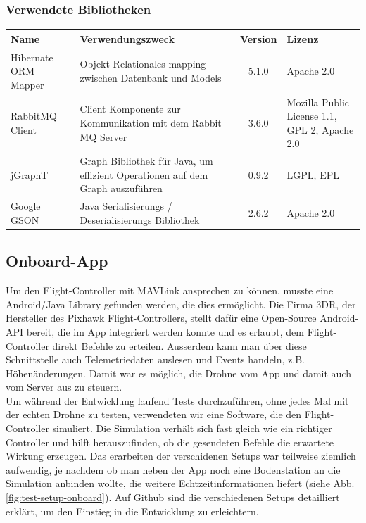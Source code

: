 \subsubsection{Verwendete Bibliotheken}
\begin{tabularx}{\textwidth}{|X|X|c|X|}
	\hline
	\textbf{Name} & \textbf{Verwendungszweck} & \textbf{Version} & \textbf{Lizenz} \\
	\hline \hline
	Hibernate ORM Mapper & Objekt-Relationales mapping zwischen Datenbank und Models  & 5.1.0 & Apache 2.0\\
	\hline 
	RabbitMQ Client & Client Komponente zur Kommunikation mit dem Rabbit MQ Server & 3.6.0 &  Mozilla Public License 1.1, GPL 2, Apache 2.0 \\
	\hline 
	jGraphT & Graph Bibliothek für Java, um effizient Operationen auf dem Graph auszuführen & 0.9.2 &  LGPL, EPL \\
	\hline 
	Google GSON & Java Serialisierungs / Deserialisierungs Bibliothek & 2.6.2 & Apache 2.0\\
	\hline 
\end{tabularx}

\subsection{Onboard-App}

Um den \Gls{Flight-Controller} mit \Gls{MAVLink} ansprechen zu können, musste eine Android/Java Library gefunden werden, die dies ermöglicht. Die Firma 3DR, der Hersteller des Pixhawk Flight-Controllers, stellt dafür eine Open-Source Android-API bereit, die im App integriert werden konnte und es erlaubt, dem Flight-Controller direkt Befehle zu erteilen. Ausserdem kann man über diese Schnittstelle auch Telemetriedaten auslesen und Events handeln, z.B. Höhenänderungen. Damit war es möglich, die Drohne vom App und damit auch vom Server aus zu steuern.\\

Um während der Entwicklung laufend Tests durchzuführen, ohne jedes Mal mit der echten Drohne zu testen, verwendeten wir eine Software, die den Flight-Controller simuliert. Die Simulation verhält sich fast gleich wie ein richtiger Controller und hilft herauszufinden, ob die gesendeten Befehle die erwartete Wirkung erzeugen. Das erarbeiten der verschidenen Setups war teilweise ziemlich aufwendig, je nachdem ob man neben der App noch eine Bodenstation an die Simulation anbinden wollte, die weitere Echtzeitinformationen liefert (siehe Abb. \ref{fig:test-setup-onboard}). Auf Github sind die verschiedenen Setups detailliert erklärt, um den Einstieg in die Entwicklung zu erleichtern.

